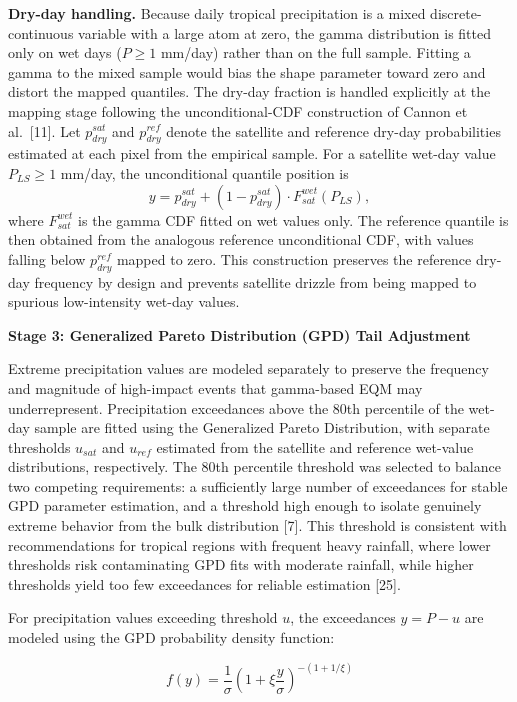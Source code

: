 \documentclass[
]{article}
\begin{document}
\textbf{Dry-day handling.} Because daily tropical precipitation is a
mixed discrete-continuous variable with a large atom at zero, the gamma
distribution is fitted only on wet days (\(P \geq 1\) mm/day) rather
than on the full sample. Fitting a gamma to the mixed sample would bias
the shape parameter toward zero and distort the mapped quantiles. The
dry-day fraction is handled explicitly at the mapping stage following
the unconditional-CDF construction of Cannon et al.~{[}11{]}. Let
\(p_{dry}^{sat}\) and \(p_{dry}^{ref}\) denote the satellite and
reference dry-day probabilities estimated at each pixel from the
empirical sample. For a satellite wet-day value \(P_{LS} \geq 1\)
mm/day, the unconditional quantile position is
\[y = p_{dry}^{sat} + (1 - p_{dry}^{sat}) \cdot F_{sat}^{wet}(P_{LS}),\]
where \(F_{sat}^{wet}\) is the gamma CDF fitted on wet values only. The
reference quantile is then obtained from the analogous reference
unconditional CDF, with values falling below \(p_{dry}^{ref}\) mapped to
zero. This construction preserves the reference dry-day frequency by
design and prevents satellite drizzle from being mapped to spurious
low-intensity wet-day values.

\textbf{Stage 3: Generalized Pareto Distribution (GPD) Tail Adjustment}

Extreme precipitation values are modeled separately to preserve the
frequency and magnitude of high-impact events that gamma-based EQM may
underrepresent. Precipitation exceedances above the 80th percentile of
the wet-day sample are fitted using the Generalized Pareto Distribution,
with separate thresholds \(u_{sat}\) and \(u_{ref}\) estimated from the
satellite and reference wet-value distributions, respectively. The 80th
percentile threshold was selected to balance two competing requirements:
a sufficiently large number of exceedances for stable GPD parameter
estimation, and a threshold high enough to isolate genuinely extreme
behavior from the bulk distribution {[}7{]}. This threshold is
consistent with recommendations for tropical regions with frequent heavy
rainfall, where lower thresholds risk contaminating GPD fits with
moderate rainfall, while higher thresholds yield too few exceedances for
reliable estimation {[}25{]}.

For precipitation values exceeding threshold \(u\), the exceedances
\(y = P - u\) are modeled using the GPD probability density function:

\[f(y) = \frac{1}{\sigma} \left( 1 + \xi \frac{y}{\sigma} \right)^{-(1 + 1/\xi)}\]
\end{document}
